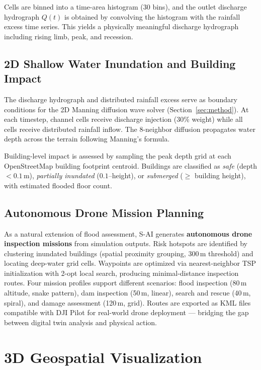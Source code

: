 \documentclass[11pt, a4paper]{article}
\begin{document}
Cells are binned into a time-area histogram (30 bins), and the outlet discharge hydrograph $Q(t)$ is obtained by convolving the histogram with the rainfall excess time series. This yields a physically meaningful discharge hydrograph including rising limb, peak, and recession.

\subsection{2D Shallow Water Inundation and Building Impact}

The discharge hydrograph and distributed rainfall excess serve as boundary conditions for the 2D Manning diffusion wave solver (Section~\ref{sec:method}). At each timestep, channel cells receive discharge injection (30\% weight) while all cells receive distributed rainfall inflow. The 8-neighbor diffusion propagates water depth across the terrain following Manning's formula.

Building-level impact is assessed by sampling the peak depth grid at each OpenStreetMap building footprint centroid. Buildings are classified as \emph{safe} (depth $< 0.1$\,m), \emph{partially inundated} ($0.1$--height), or \emph{submerged} ($\geq$ building height), with estimated flooded floor count.

\subsection{Autonomous Drone Mission Planning}
\label{sec:drone}

As a natural extension of flood assessment, S-AI generates \textbf{autonomous drone inspection missions} from simulation outputs. Risk hotspots are identified by clustering inundated buildings (spatial proximity grouping, 300\,m threshold) and locating deep-water grid cells. Waypoints are optimized via nearest-neighbor TSP initialization with 2-opt local search, producing minimal-distance inspection routes. Four mission profiles support different scenarios: flood inspection (80\,m altitude, snake pattern), dam inspection (50\,m, linear), search and rescue (40\,m, spiral), and damage assessment (120\,m, grid). Routes are exported as KML files compatible with DJI Pilot for real-world drone deployment --- bridging the gap between digital twin analysis and physical action.

\section{3D Geospatial Visualization}
\label{sec:viz}
\end{document}
